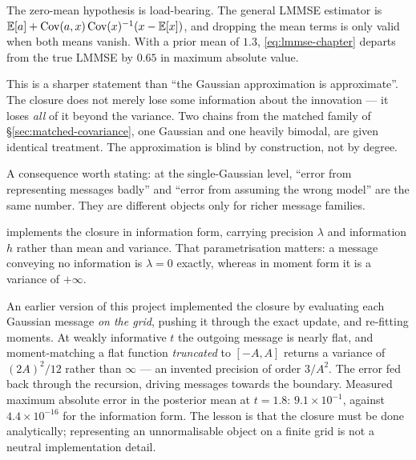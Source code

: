 \begin{pitfall}
The zero-mean hypothesis is load-bearing. The general LMMSE estimator is
$\mathbb{E}[a]+\operatorname{Cov}(a,x)\operatorname{Cov}(x)^{-1}(x-\mathbb{E}[x])$, and dropping the mean terms is only valid when both
means vanish. With a prior mean of $1.3$, \eqref{eq:lmmse-chapter} departs from the true LMMSE
by $0.65$ in maximum absolute value.
\end{pitfall}

\begin{intuition}
This is a sharper statement than ``the Gaussian approximation is approximate''. The closure
does not merely lose some information about the innovation --- it loses \emph{all} of it beyond
the variance. Two chains from the matched family of \S\ref{sec:matched-covariance}, one
Gaussian and one heavily bimodal, are given identical treatment. The approximation is blind by
construction, not by degree.

A consequence worth stating: at the single-Gaussian level, ``error from representing messages
badly'' and ``error from assuming the wrong model'' are the same number. They are different
objects only for richer message families.
\end{intuition}

\begin{codebox}
 implements the closure in information form,
carrying precision $\lambda$ and information $h$ rather than mean and variance. That
parametrisation matters: a message conveying no information is $\lambda=0$ exactly, whereas in
moment form it is a variance of $+\infty$.
\end{codebox}

\begin{pitfall}
An earlier version of this project implemented the closure by evaluating each Gaussian message
\emph{on the grid}, pushing it through the exact update, and re-fitting moments. At weakly
informative $t$ the outgoing message is nearly flat, and moment-matching a flat function
\emph{truncated} to $[-A,A]$ returns a variance of $(2A)^2/12$ rather than $\infty$ --- an
invented precision of order $3/A^2$. The error fed back through the recursion, driving messages
towards the boundary. Measured maximum absolute error in the posterior mean at $t=1.8$:
$9.1\times10^{-1}$, against $4.4\times10^{-16}$ for the information form. The lesson is that
the closure must be done analytically; representing an unnormalisable object on a finite grid
is not a neutral implementation detail.
\end{pitfall}

